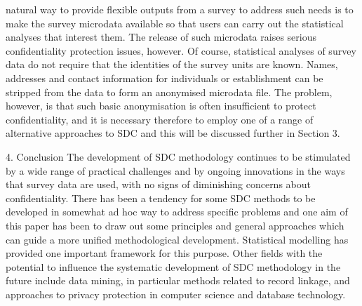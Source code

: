 natural way to provide flexible outputs from a survey to address such needs is to make 
the survey microdata available so that users can carry out the statistical analyses that 
interest them. 
The release of such microdata raises serious confidentiality protection issues, 
however. Of course, statistical analyses of survey data do not require that the identities of 
the survey units are known. Names, addresses and contact information for individuals or 
establishment can be stripped from the data to form an anonymised microdata file. The 
problem, however, is that such basic anonymisation is often insufficient to protect 
confidentiality, and it is necessary therefore to employ one of a range of alternative 
approaches to SDC and this will be discussed further in Section 3. 


4. Conclusion 
The development of SDC methodology continues to be stimulated by a wide range of 
practical challenges and by ongoing innovations in the ways that survey data are used, 
with no signs of diminishing concerns about confidentiality. There has been a tendency 
for some SDC methods to be developed in somewhat ad hoc way to address specific 
problems and one aim of this paper has been to draw out some principles and general 
approaches which can guide a more unified methodological development. Statistical 
modelling has provided one important framework for this purpose. Other fields with the 
potential to influence the systematic development of SDC methodology in the future 
include data mining, in particular methods related to record linkage, and approaches to 
privacy protection in computer science and database technology. 
